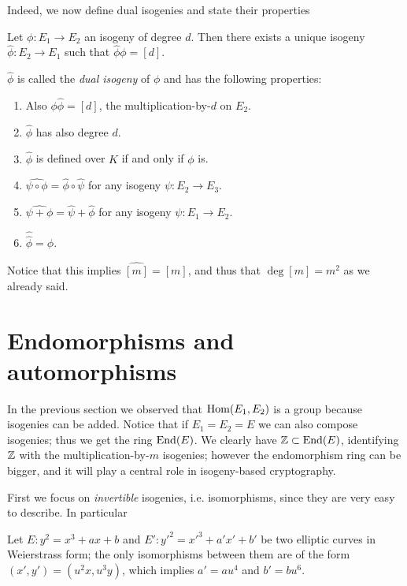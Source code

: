 Indeed, we now define dual isogenies and state their properties

\begin{theorem}
    Let $\phi:E_1\to E_2$ an isogeny of degree $d$. Then there exists a unique isogeny $\hat\phi:E_2\to E_1$ such that $\hat\phi \phi=[d]$.
    
    $\hat\phi$ is called the \emph{dual isogeny} of $\phi$ and has the following properties:
    \begin{enumerate}
        \item Also $\phi\hat\phi=[d]$, the multiplication-by-$d$ on $E_2$.
        \item $\hat\phi$ has also degree $d$.
        \item $\hat\phi$ is defined over $K$ if and only if $\phi$ is.
        \item $\widehat{\psi\circ\phi}=\hat\phi\circ\hat\psi$ for any isogeny $\psi:E_2\to E_3$.
        \item $\widehat{\psi + \phi}=\hat\psi + \hat\phi$ for any isogeny $\psi:E_1\to E_2$.
        \item $\hat{\hat\phi}=\phi$.
    \end{enumerate}
\end{theorem}

Notice that this implies $\widehat{[m]}=[m]$, and thus that $\deg[m]=m^2$ as we already said.

\section{Endomorphisms and automorphisms}

In the previous section we observed that $\operatorname{Hom}(E_1, E_2)$ is a group because isogenies can be added. Notice that if $E_1=E_2=E$ we can also compose isogenies; thus we get the ring $\operatorname{End}(E)$. We clearly have $\mathbb{Z}\subset\operatorname{End}(E)$, identifying $\mathbb{Z}$ with the multiplication-by-$m$ isogenies; however the endomorphism ring can be bigger, and it will play a central role in isogeny-based cryptography.

First we focus on \emph{invertible} isogenies, i.e. isomorphisms, since they are very easy to describe. In particular
\begin{proposition}
    Let $E:y^2=x^3+ax+b$ and $E':{y'}^2={x'}^3+a'x'+b'$ be two elliptic curves in Weierstrass form; the only isomorphisms between them are of the form $(x',y')=(u^2x, u^3y)$, which implies $a'=au^4$ and $b'=bu^6$.
\end{proposition}

